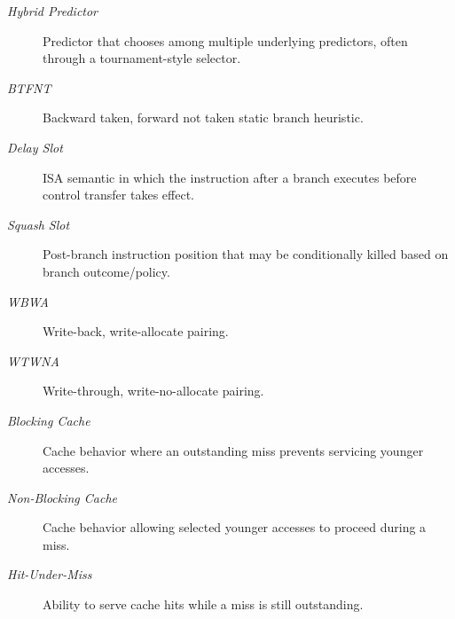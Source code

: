 \begin{description}
    \item[\textit{Hybrid Predictor}] Predictor that chooses among multiple underlying predictors, often through a tournament-style selector.
    \item[\textit{BTFNT}] Backward taken, forward not taken static branch heuristic.
    \item[\textit{Delay Slot}] ISA semantic in which the instruction after a branch executes before control transfer takes effect.
    \item[\textit{Squash Slot}] Post-branch instruction position that may be conditionally killed based on branch outcome/policy.
    \item[\textit{WBWA}] Write-back, write-allocate pairing.
    \item[\textit{WTWNA}] Write-through, write-no-allocate pairing.
    \item[\textit{Blocking Cache}] Cache behavior where an outstanding miss prevents servicing younger accesses.
    \item[\textit{Non-Blocking Cache}] Cache behavior allowing selected younger accesses to proceed during a miss.
    \item[\textit{Hit-Under-Miss}] Ability to serve cache hits while a miss is still outstanding.
\end{description}


